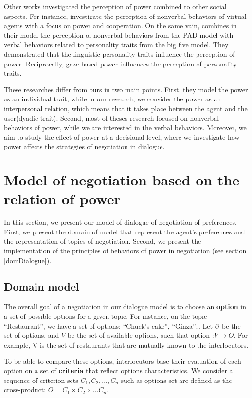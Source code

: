 \documentclass{article}
\begin{document}
	\par Other works investigated the perception of power combined to other social aspects. For instance,\cite{strassmann2016effect} investigate the perception of nonverbal behaviors of virtual agents with a focus on power and cooperation. On the same vain,  \cite{bee2010bossy} combines in their model the perception of nonverbal behaviors from the PAD model \cite{mehrabian1996analysis} with verbal behaviors related to personality traits from the big five model.
	 They demonstrated that the linguistic personality traits influence the perception of power. Reciprocally, gaze-based power influences the perception of personality traits.
	
	 
	These researches differ from ours in two main points. First, they model the power as an individual trait, while in our research, we consider the power as an interpersonal relation, which means that it takes place between the agent and the user(dyadic trait). 
	Second, most of theses research focused on nonverbal behaviors of power, while we are interested in the verbal behaviors. Moreover, we aim to study the effect of power at a decisional level, where we investigate how power affects the strategies of negotiation in dialogue.
	
	
	\section{Model of negotiation based on the relation of power}
	In this section, we present our model of dialogue of negotiation of preferences.	
	First, we present the domain of model that represent the agent's preferences and the representation of topics of negotiation. Second, we present the implementation of the principles of behaviors of power in negotiation (see section \ref{domDialogue}).

	\subsection{Domain model}
	The overall goal of a negotiation in our dialogue model is to choose an \textbf{option} in a set of possible options for a given topic. For instance, on the topic ``Restaurant'', we have a set of options: ``Chuck's cake'', ``Ginza''\ldots 
	 Let $\mathcal{O}$ be the set of options, and $V$ be the set of available options, such that option :$ V\rightarrow O$. For example, V is the set of restaurants that are mutually known to the interlocutors. 
		
	\par To be able to compare these options, interlocutors base their evaluation of each option on a set of \textbf{criteria} that reflect options characteristics. We consider a sequence of criterion sets $C_1, C_2, ..., C_n$ such as options set are defined as the cross-product:
	$O = C_1 \times C_2 \times \ldots C_n$.
	
\end{document}
